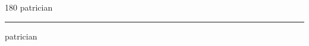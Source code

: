 
\begin{frame}
\begin{center}
\begin{turn}{180}
{\fontsize{2.5cm}{1em}\selectfont patrician}
\end{turn}
\vspace{1em}\par  
\hrule
\vspace{1em}\par  
{\fontsize{2.5cm}{1em}\selectfont patrician}
\end{center}
\end{frame}

